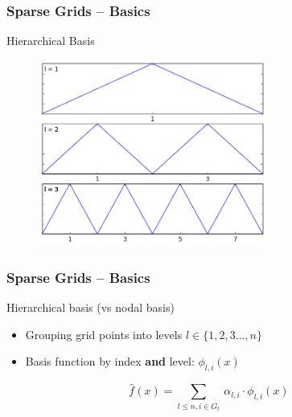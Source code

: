 \begin{frame}
  \frametitle{Sparse Grids -- Basics}
  \topline
  \vspace{-10px}
  \begin{block}{Hierarchical Basis}
    \begin{figure}[!htp]
      \centering
      \includegraphics[width=7.5cm]{images/sparse_hats}
      \vspace{-12px}
      \caption{}
    \end{figure}
  \end{block}
\end{frame}

\begin{frame}
  \frametitle{Sparse Grids -- Basics}
  \topline
  \vspace{-10px}
  \begin{block}{Hierarchical basis (vs nodal basis)}
    \begin{itemize}
      \item Grouping grid points into levels $l \in \{1,2,3\dots , n\}$
      \item Basis function by index \textbf{and} level: $\phi_{l,i}(x)$
    \end{itemize}
    \vspace{20px}
      $$\hat{f}(x) = \sum_{l \leq n,i \in G_l}{\ \alpha_{l,i} \cdot \phi_{l,i}(x)}$$
  \end{block}
\end{frame}

